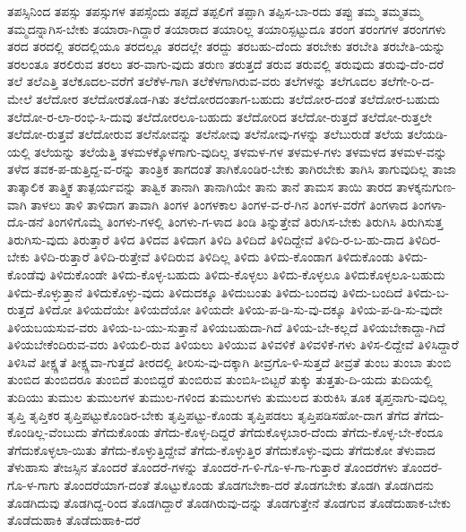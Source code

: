 {ತಪಸ್ಸಿನಿಂದ
ತಪಸ್ಸು
ತಪಸ್ಸುಗಳ
ತಪಸ್ಸೆಂದು
ತಪ್ಪದೆ
ತಪ್ಪಲಿಗೆ
ತಪ್ಪಾಗಿ
ತಪ್ಪಿಸ-ಬಾ-ರದು
ತಪ್ಪು
ತಮ್ಮ
ತಮ್ಮತಮ್ಮ
ತಮ್ಮದನ್ನಾಗಿಸ-ಬೇಕು
ತಯಾರಾ-ಗಿದ್ದಾರೆ
ತಯಾರಾದ
ತಯಾರಿಲ್ಲ
ತಯಾರಿಸ್ಪಟ್ಟುದೂ
ತರಂಗ
ತರಂಗಗಳ
ತರಂಗಗಳು
ತರದ
ತರದಲ್ಲಿ
ತರದಲ್ಲಿಯೂ
ತರದಲ್ಲೂ
ತರದಲ್ಲೇ
ತರದ್ದು
ತರಬಹು-ದೆಂದು
ತರಬೇಕು
ತರಬೇತಿ
ತರಬೇತಿ-ಯನ್ನು
ತರಲಂತೂ
ತರಲಿರುವ
ತರಲು
ತರ-ವಾಗು-ವುದು
ತರುಣ
ತರುತ್ತದೆ
ತರುವ
ತರುವಲ್ಲಿ
ತರುವುದು
ತರುವು-ದೆಂ-ದರೆ
ತಲೆ
ತಲೆಎತ್ತಿ
ತಲೆಕೂದಲ-ವರೆಗೆ
ತಲೆಕೆಳ-ಗಾಗಿ
ತಲೆಕೆಳಗಾಗಿರುವ-ವರು
ತಲೆಗಳನ್ನು
ತಲೆಗೂದಲ
ತಲೆಗೇ-ರಿ-ದ-ಮೇಲೆ
ತಲೆದೋರ
ತಲೆದೋರತೊಡ-ಗಿತು
ತಲೆದೋರದಂತಾಗ-ಬಹುದು
ತಲೆದೋರ-ದಂತೆ
ತಲೆದೋರ-ಬಹುದು
ತಲೆದೋ-ರ-ಲಾ-ರಂಭಿ-ಸಿ-ದುವು
ತಲೆದೋರಲೂ-ಬಹುದು
ತಲೆದೋರಿದ
ತಲೆದೋ-ರುತ್ತದೆ
ತಲೆದೋ-ರುತ್ತಲೇ
ತಲೆದೋ-ರುತ್ತವೆ
ತಲೆದೋರುವ
ತಲೆನೋವನ್ನು
ತಲೆನೋವು
ತಲೆನೋವು-ಗಳನ್ನು
ತಲೆಬುರುಡೆ
ತಲೆಯ
ತಲೆಯಡಿ-ಯಲ್ಲಿ
ತಲೆಯನ್ನು
ತಲೆಯೆತ್ತಿ
ತಳಮಳಕ್ಕೊಳಗಾಗು-ವುದಿಲ್ಲ
ತಳಮಳ-ಗಳ
ತಳಮಳ-ಗಳು
ತಳಮಳದ
ತಳಮಳ-ವನ್ನು
ತಳೆದ
ತವಕ-ಪ-ಡುತ್ತಿದ್ದ-ವ-ರನ್ನು
ತಾಂತ್ರಿಕ
ತಾಗದಂತೆ
ತಾಗಿಕೊಂಡಿರ-ಬೇಕು
ತಾಗಿರಬೇಕು
ತಾಗಿಸಿ
ತಾಗುವುದಿಲ್ಲ
ತಾಜಾ
ತಾತ್ಕಾಲಿಕ
ತಾತ್ತ್ವಿಕ
ತಾತ್ಪರ್ಯವನ್ನು
ತಾತ್ವಿಕ
ತಾನಾಗಿ
ತಾನಾಗಿಯೇ
ತಾನು
ತಾನೆ
ತಾಮಸ
ತಾಯಿ
ತಾರದ
ತಾಳಕ್ಕನುಗುಣ-ವಾಗಿ
ತಾಳಲು
ತಾಳಿ
ತಾಳಿದಾಗ
ತಾವಾಗಿ
ತಿಂಗಳ
ತಿಂಗಳಕಾಲ
ತಿಂಗಳ-ವ-ರೆ-ಗಿನ
ತಿಂಗಳ-ವರೆಗೆ
ತಿಂಗಳಾದ
ತಿಂಗಳಾ-ದೊ-ಡನೆ
ತಿಂಗಳಿಗೊಮ್ಮೆ
ತಿಂಗಳು-ಗಳಲ್ಲಿ
ತಿಂಗಳು-ಗ-ಳಾದ
ತಿಂಡಿ
ತಿನ್ನುತ್ತೇವೆ
ತಿರುಗಿಸ-ಬೇಕು
ತಿರುಗಿಸಿ
ತಿರುಗಿಸುತ್ತ
ತಿರುಗಿಸು-ವುದು
ತಿರುತ್ತಾರೆ
ತಿಳಿದ
ತಿಳಿದವ
ತಿಳಿದಾಗ
ತಿಳಿದಿ
ತಿಳಿದಿದೆ
ತಿಳಿದಿದ್ದೇವೆ
ತಿಳಿದಿ-ರ-ಬ-ಹು-ದಾದ
ತಿಳಿದಿರ-ಬೇಕು
ತಿಳಿದಿ-ರುತ್ತಾರೆ
ತಿಳಿದಿ-ರುತ್ತೇವೆ
ತಿಳಿದಿರುವ
ತಿಳಿದಿಲ್ಲ
ತಿಳಿದು
ತಿಳಿದು-ಕೊಂಡಾಗ
ತಿಳಿದುಕೊಂಡು
ತಿಳಿದು-ಕೊಂಡೆವು
ತಿಳಿದುಕೊಂಡೇ
ತಿಳಿದು-ಕೊಳ್ಳ-ಬಹುದು
ತಿಳಿದು-ಕೊಳ್ಳಲು
ತಿಳಿದು-ಕೊಳ್ಳಲೂ
ತಿಳಿದುಕೊಳ್ಳಲೂ-ಬಹುದು
ತಿಳಿದು-ಕೊಳ್ಳುತ್ತಾನೆ
ತಿಳಿದುಕೊಳ್ಳು-ವುದು
ತಿಳಿದುದಕ್ಕೂ
ತಿಳಿದುಬಂತು
ತಿಳಿದು-ಬಂದವು
ತಿಳಿದು-ಬಂದಿದೆ
ತಿಳಿದು-ಬ-ರುತ್ತದೆ
ತಿಳಿದೋ
ತಿಳಿಯದೆಯೇ
ತಿಳಿಯದೆಯೋ
ತಿಳಿಯದೇ
ತಿಳಿಯ-ಪ-ಡಿ-ಸು-ವು-ದಕ್ಕೂ
ತಿಳಿಯ-ಪ-ಡಿ-ಸು-ವುದೇ
ತಿಳಿಯಬಯಸುವ-ವರು
ತಿಳಿಯ-ಬ-ಯು-ಸುತ್ತಾನೆ
ತಿಳಿಯಬಹುದಾ-ಗಿದೆ
ತಿಳಿಯ-ಬೇ-ಕಲ್ಲದೆ
ತಿಳಿಯಬೇಕಾದ್ದಾ-ಗಿದೆ
ತಿಳಿಯಬೇಕೆಂದಿರುವ-ವರು
ತಿಳಿಯಲಿ-ರುವ
ತಿಳಿಯಲು
ತಿಳಿಯುವ
ತಿಳಿವಳಿಕೆ
ತಿಳಿವಳಿಕೆ-ಗಳು
ತಿಳಿಸ-ಲಿದ್ದೇವೆ
ತಿಳಿಸಿದ್ದಾರೆ
ತಿಳಿಸಿವೆ
ತೀಕ್ಷ್ಣತೆ
ತೀಕ್ಷ್ಣವಾ-ಗುತ್ತದೆ
ತೀರದಲ್ಲಿ
ತೀರಿಸು-ವು-ದಕ್ಕಾಗಿ
ತೀವ್ರಗೊ-ಳಿ-ಸುತ್ತದೆ
ತೀವ್ರತೆ
ತುಂಬ
ತುಂಬಾ
ತುಂಬಿ
ತುಂಬಿದ
ತುಂಬಿದರೂ
ತುಂಬಿದೆ
ತುಂಬಿದ್ದರೆ
ತುಂಬಿರುವ
ತುಂಬಿಸಿ-ಬಿಟ್ಟರೆ
ತುಕ್ಕು
ತುತ್ತತು-ದಿ-ಯದು
ತುದಿಯಲ್ಲಿ
ತುದಿಯು
ತುಮುಲ
ತುಮುಲಗಳ
ತುಮುಲ-ಗಳಿಂದ
ತುಮುಲಗಳು
ತುಮುಲದ
ತುರುಕಿಸಿ
ತೂಕ
ತೃಪ್ತನಾಗು-ವುದಿಲ್ಲ
ತೃಪ್ತಿ
ತೃಪ್ತಿಕರ
ತೃಪ್ತಿಪಟ್ಟುಕೊಂಡಿರ-ಬೇಕು
ತೃಪ್ತಿಪಟ್ಟು-ಕೊಂಡು
ತೃಪ್ತಿಪಡಲು
ತೃಪ್ತಿಪಡಿಸಹೋ-ದಾಗ
ತೆಗೆದ
ತೆಗೆದು-ಕೊಂಡಿಲ್ಲ-ವೆಂಬುದು
ತೆಗೆದುಕೊಂಡು
ತೆಗೆದು-ಕೊಳ್ಳ-ದಿದ್ದರೆ
ತೆಗೆದುಕೊಳ್ಳಬಾರ-ದೆಂದು
ತೆಗೆದು-ಕೊಳ್ಳ-ಬೇ-ಕೆಂದೂ
ತೆಗೆದುಕೊಳ್ಳಲಾ-ಯಿತು
ತೆಗೆದು-ಕೊಳ್ಳುತ್ತಿದ್ದೇವೆ
ತೆಗೆದು-ಕೊಳ್ಳುತ್ತಿರ
ತೆಗೆದುಕೊಳ್ಳು-ವುದು
ತೆಗೆದುಕೋ
ತೆಳುವಾದ
ತೆಳುಹಾಸು
ತೇಜಸ್ಸಿನ
ತೊಂದರೆ
ತೊಂದರೆ-ಗಳನ್ನು
ತೊಂದರೆ-ಗ-ಳಿ-ಗೊ-ಳ-ಗಾ-ಗುತ್ತಾರೆ
ತೊಂದರೆಗಳು
ತೊಂದರೆ-ಗೊ-ಳ-ಗಾಗು
ತೊಂದರೆಯಾಗ-ದಂತೆ
ತೊಟ್ಟುಕೊಂಡು
ತೊಡಗಬೇಕಾ-ದರೆ
ತೊಡಗಬೇಕು
ತೊಡಗಿ
ತೊಡಗಿದನು
ತೊಡಗಿದುವು
ತೊಡಗಿದ್ದ-ರಿಂದ
ತೊಡಗಿದ್ದಾರೆ
ತೊಡಗಿರುವು-ದನ್ನು
ತೊಡಗುತ್ತೇನೆ
ತೊಡಗುವ
ತೊಡೆದುಹಾಕ-ಬೇಕು
ತೊಡೆದುಹಾಕಿ
ತೊಡೆದುಹಾಕಿ-ದರೆ
}
